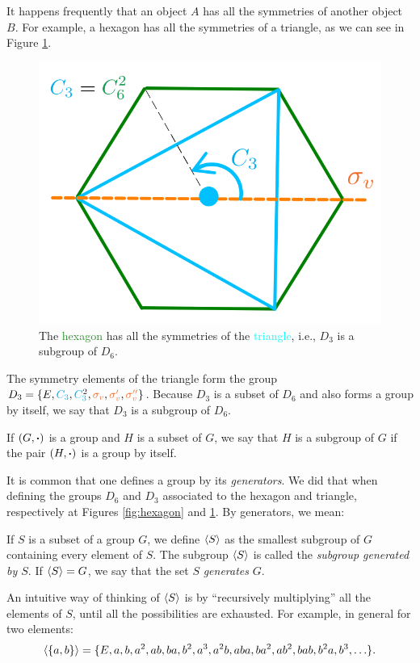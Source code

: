 It happens frequently that an object $A$ has all the symmetries of another object $B$. For example, a hexagon has all the symmetries of a triangle, as we can see in Figure \ref{fig:hexagon_subgroup}.
\begin{figure}[H]
\centering
\includegraphics[width=0.4\linewidth]{fig/hexagon_subgroup.png}
\caption{The \textcolor{ForestGreen}{hexagon} has all the symmetries of the \textcolor{Cyan}{triangle}, i.e., $D_3$ is a subgroup of $D_6$.}
\label{fig:hexagon_subgroup}
\end{figure}

The symmetry elements of the triangle form the group $D_3 = \{E, \Ct, \Ctn{2}, \sv, \svp, \svpp\}$. Because $D_3$ is a subset of $D_6$ and also forms a group by itself, we say that $D_3$ is a subgroup of $D_6$.


\begin{definition}
If $(G, \vdot)$ is a group and $H$ is a subset of $G$, we say that $H$ is a subgroup of $G$ if the pair $(H, \vdot)$ is a group by itself.
\end{definition}

It is common that one defines a group by its \textit{generators}. We did that when defining the groups $D_6$ and $D_3$ associated to the hexagon and triangle, respectively at Figures \ref{fig:hexagon} and \ref{fig:hexagon_subgroup}. By generators, we mean:

\begin{definition}
If $S$ is a subset of a group $G$, we define $\ev{S}$ as the smallest subgroup of $G$ containing every element of $S$. The subgroup $\ev{S}$ is called the \textit{subgroup generated by $S$}. If $\ev{S} = G$, we say that the set $S$ \textit{generates} $G$.
\end{definition}

An intuitive way of thinking of $\ev{S}$ is by ``recursively multiplying'' all the elements of $S$, until all the possibilities are exhausted. For example, in general for two elements:
$$
\ev{\{a,b\}} = \{E, a, b, a^2, ab, ba, b^2, a^3, a^2b, aba, ba^2, ab^2, bab, b^2a, b^3, \ldots\}.
$$

